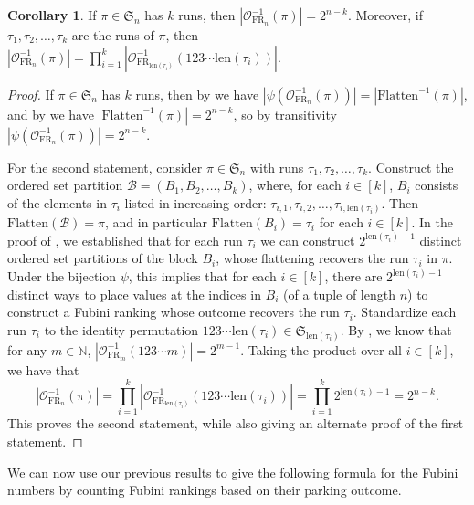 \documentclass{amsart}
\newcommand{\Flatten}[0]{\mathrm{Flatten}}
\theoremstyle{definition}
\newtheorem{corollary}{Corollary}[section]
\theoremstyle{definition}
\theoremstyle{remark}
\newcommand{\FR}[1]{\mathrm{FR}_{#1}}
\newcommand{\out}{\mathcal{O}}
\newcommand{\len}{\mathrm{len}}
\newcommand{\Sym}{\mathfrak{S}}
\begin{document}
\begin{corollary}\label{cor: fubini count is 2^n-k}
    If $\pi\in\Sym_n$ has $k$ runs,  then
    $|\out_{\FR{n}}^{-1}(\pi)|=2^{n-k}$. 
    Moreover, if $\tau_1,\tau_2,\ldots,\tau_k$ are the runs of $\pi$, then 
    $|\out_{\FR{n}}^{-1}(\pi)|=\prod_{i=1}^k|\out_{\FR{\len(\tau_i)}}^{-1}(123\cdots\len(\tau_i))|$.
\end{corollary}
\begin{proof}
    If $\pi\in\Sym_n$ has $k$ runs, then by  we have $|\psi(\out_{\FR{n}}^{-1}(\pi))|=|\Flatten^{-1}(\pi)|$, and by  we have $|\Flatten^{-1}(\pi)|=2^{n-k}$, so by transitivity
    $|\psi(\out_{\FR{n}}^{-1}(\pi))|=2^{n-k}$.

    For the second statement,    consider $\pi\in\Sym_{n}$ with runs $\tau_1,\tau_2,\ldots,\tau_k$. Construct the ordered set partition $\mathcal{B}=(B_1,B_2,\ldots,B_k)$, where, for each $i\in[k]$, $B_i$ consists of the elements in $\tau_i$ listed in increasing order: $\tau_{i,1},\tau_{i,2},\ldots,\tau_{i,\len(\tau_i)}$. 
    Then $\Flatten(\mathcal{B})=\pi$, and in particular $\Flatten(B_i)=\tau_i$ for each $i\in[k]$.
 In the proof of , we established that for each run $\tau_i$ we can construct $2^{\len(\tau_i)-1}$ distinct ordered set partitions of the block $B_i$, whose flattening recovers the run $\tau_i$ in $\pi$. 
 Under the bijection $\psi$, this implies that for each $i\in[k]$, there are $2^{\len(\tau_i)-1}$ distinct ways to place values at the indices in $B_i$ (of a tuple of length $n$) to construct a Fubini ranking whose outcome recovers the run $\tau_i$. 
 Standardize each run $\tau_i$ to the identity permutation $123\cdots \len(\tau_i)\in \Sym_{\len(\tau_i)}$.
 By , we know that
 for any $m\in \mathbb{N}$, $|\out_{\FR{m}}^{-1}(123\cdots m)|=2^{m-1}$. 
 Taking the product over all $i\in[k]$,
 we have that  
 \[|\out_{\FR{n}}^{-1}(\pi)|=\prod_{i=1}^k |\out_{\FR{\len(\tau_i)}}^{-1}(123\cdots \len(\tau_i))|=\prod_{i=1}^k2^{\len(\tau_i)-1}=2^{n-k}.\] This proves the second statement, while also giving an alternate proof of the first statement.
\end{proof}

We can now use our previous results to give the following formula for the Fubini numbers by counting Fubini rankings based on their parking outcome.
\end{document}
